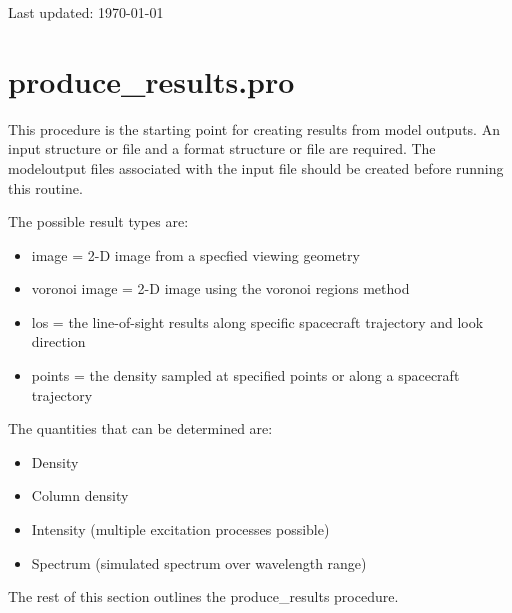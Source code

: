 \documentclass[11pt]{article}
\begin{document}
Last updated: \today

\tableofcontents

\section{produce\_results.pro}

This procedure is the starting point for creating results from model outputs. 
An input structure or file and a format structure or file are required. The 
modeloutput files associated with the input file should be created before 
running this routine. 

The possible result types are: 
\begin{itemize}
\item image = 2-D image from a specfied viewing geometry
\item voronoi image = 2-D image using the voronoi regions method
\item los = the line-of-sight results along specific spacecraft trajectory and 
look direction
\item points = the density sampled at specified points or along a spacecraft 
trajectory
\end{itemize}

The quantities that can be determined are:
\begin{itemize}
\item Density
\item Column density
\item Intensity (multiple excitation processes possible)
\item Spectrum (simulated spectrum over wavelength range) 
\end{itemize}

The rest of this section outlines the produce\_results procedure.
\end{document}
